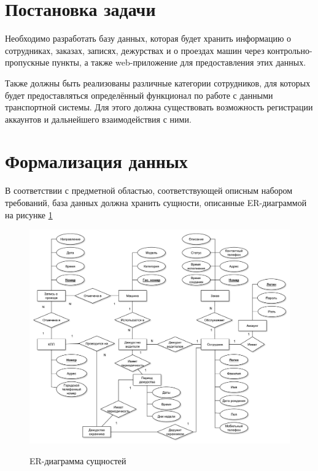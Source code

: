 \section{Постановка задачи}
Необходимо разработать базу данных, которая будет хранить информацию о сотрудниках, заказах, записях, дежурствах и о проездах машин через контрольно-пропускные пункты, а также web-приложение для предоставления этих данных.

Также должны быть реализованы различные категории сотрудников, для которых будет предоставляться определённый функционал по работе с данными транспортной системы. Для этого должна существовать возможность регистрации аккаунтов и дальнейшего взаимодействия с ними.

\newpage
\section{Формализация данных}
В соответствии с предметной областью, соответствующей описным набором требований, база данных должна хранить сущности, описанные ER-диаграммой на рисунке \ref{er_analitics}


\begin{figure}[ph!] 
	\begin{center}
		{\includegraphics[scale=0.46]{schemes/er.pdf}}
		\caption{ER-диаграмма сущностей}
		\label{er_analitics}
	\end{center}
\end{figure}

